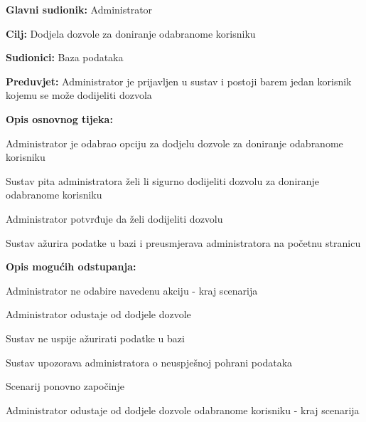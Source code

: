 					\noindent {}
					\begin{packed_item}
	
						\item \textbf{Glavni sudionik: }Administrator
						\item  \textbf{Cilj:} Dodjela dozvole za doniranje odabranome korisniku
						\item  \textbf{Sudionici:} Baza podataka
						\item  \textbf{Preduvjet:} Administrator je prijavljen u sustav i postoji barem jedan korisnik kojemu se može dodijeliti dozvola
						
						\item  \textbf{Opis osnovnog tijeka:}
						
						\item[] \begin{packed_enum}
							\item Administrator je odabrao opciju za dodjelu dozvole za doniranje odabranome korisniku
							\item Sustav pita administratora želi li sigurno dodijeliti dozvolu za doniranje odabranome korisniku
							\item Administrator potvrđuje da želi dodijeliti dozvolu
							\item Sustav ažurira podatke u bazi i preusmjerava administratora na početnu stranicu
						\end{packed_enum}

						\eject
						
						\item  \textbf{Opis mogućih odstupanja:}

						\item[] \begin{packed_item}
							\item[1.a] Administrator ne odabire navedenu akciju - kraj scenarija
							\item[3.a] Administrator odustaje od dodjele dozvole
							\item[4.a] Sustav ne uspije ažurirati podatke u bazi
							\item[] \begin{packed_enum}
								\item Sustav upozorava administratora o neuspješnoj pohrani podataka
								\item
									\begin{packed_enum}
										\item Scenarij ponovno započinje 
										\item Administrator odustaje od dodjele dozvole odabranome korisniku - kraj scenarija
									\end{packed_enum}
							\end{packed_enum}					
						\end{packed_item}
					\end{packed_item}

